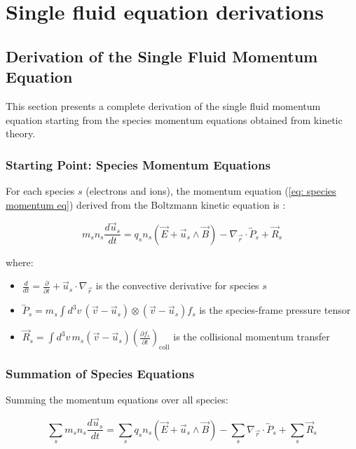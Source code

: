 \chapter{Single fluid equation derivations}
\section{Derivation of the Single Fluid Momentum Equation}
\label{sec:Derivation of the Single Fluid Momentum Equation}

This section presents a complete derivation of the single fluid momentum equation starting from the species momentum equations obtained from kinetic theory.

\subsection{Starting Point: Species Momentum Equations}

For each species $s$ (electrons and ions), the momentum equation (\ref{eq: species momentum eq}) derived from the Boltzmann kinetic equation is :

\begin{equation*}
m_s n_s \frac{d\vec{u}_s}{dt} = q_s n_s (\vec{E} + \vec{u}_s \wedge \vec{B}) - \nabla_{\vec{r}} \cdot \overleftrightarrow{P}_s + \vec{R}_s
\end{equation*}

where:
\begin{itemize}
\item $\displaystyle \frac{d}{dt} = \frac{\partial}{\partial t} + \vec{u}_s \cdot \nabla_{\vec{r}}$ is the convective derivative for species $s$
\item $\displaystyle \overleftrightarrow{P}_s = m_s \int d^3v \, (\vec{v} - \vec{u}_s) \otimes (\vec{v} - \vec{u}_s) f_s$ is the species-frame pressure tensor
\item $\displaystyle \vec{R}_s = \int d^3v \, m_s (\vec{v} - \vec{u}_s) \left(\frac{\partial f_s}{\partial t}\right)_{\text{coll}}$ is the collisional momentum transfer
\end{itemize}

\subsection{Summation of Species Equations}

Summing the momentum equations over all species:

\begin{equation*}
\sum_s m_s n_s \frac{d\vec{u}_s}{dt} = \sum_s q_s n_s (\vec{E} + \vec{u}_s \wedge \vec{B}) - \sum_s \nabla_{\vec{r}} \cdot \overleftrightarrow{P}_s + \sum_s \vec{R}_s
\end{equation*}

